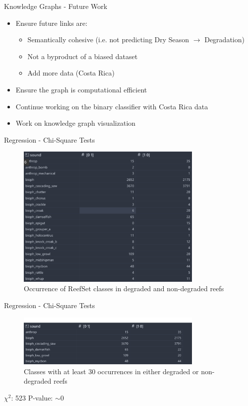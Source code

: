 \begin{frame}{Knowledge Graphs - Future Work}
    \begin{itemize}
        \item Ensure future links are:
        \begin{itemize}
            \item Semantically cohesive (i.e. not predicting Dry Season $\rightarrow$ Degradation)
            \item Not a byproduct of a biased dataset
            \item Add more data (Costa Rica)
        \end{itemize}
        \item Ensure the graph is computational efficient
        \item Continue working on the binary classifier with Costa Rica data
        \item Work on knowledge graph visualization
    \end{itemize}
\end{frame}

\begin{frame}{Regression - Chi-Square Tests}
    \begin{figure}
        \centering
        \includegraphics[height=0.8\textheight,width=0.8\textwidth,keepaspectratio]{images/reefset_classes.png}
        \caption{Occurrence of ReefSet classes in degraded and non-degraded reefs}
    \end{figure}
\end{frame}

\begin{frame}{Regression - Chi-Square Tests}
    \begin{figure}
        \centering
        \includegraphics[height=0.8\textheight,width=0.8\textwidth,keepaspectratio]{images/chi_square_test.png}
        \caption{Classes with at least 30 occurrences in either degraded or non-degraded reefs}
    \end{figure}
    $\chi^2$: 523
    \newline
    P-value: $\sim$0
\end{frame}

